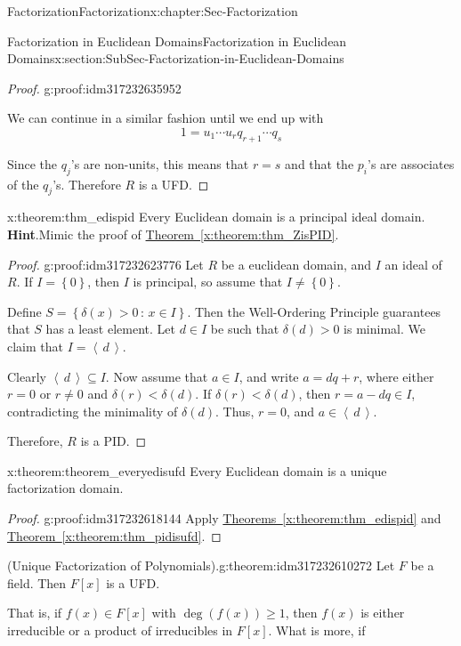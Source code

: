 \documentclass[oneside,10pt,]{book}
\newcommand{\blocktitlefont}{\relax}
\newcommand{\xreffont}{\relax}
\numberwithin{equation}{section}
\renewcommand{\ge}{\geqslant}
\newcommand{\ideal}[1]{\left\langle\, #1 \,\right\rangle}
\newcommand{\set}[1]{\left\{ {#1} \right\}}
\newcommand{\setof}[2]{{\left\{#1\,\colon\,#2\right\}}}
\newcommand{\lt}{<}
\begin{document}
\begin{chapterptx}{Factorization}{}{Factorization}{}{}{x:chapter:Sec-Factorization}
\begin{sectionptx}{Factorization in Euclidean Domains}{}{Factorization in Euclidean Domains}{}{}{x:section:SubSec-Factorization-in-Euclidean-Domains}
\begin{proof}{}{g:proof:idm317232635952}
%
\par
We can continue in a similar fashion until we end up with%
\begin{equation*}
1=u_1\cdots u_rq_{r+1}\cdots q_s
\end{equation*}
%
\par
Since the \(q_j\)'s are non-units, this means that \(r=s\) and that the \(p_i\)'s are associates of the \(q_j\)'s. Therefore \(R\) is a UFD.%
\end{proof}
\begin{theorem}{}{}{x:theorem:thm_edispid}%
Every Euclidean domain is a principal ideal domain.%
\textbf{\blocktitlefont Hint}.\quad{}Mimic the proof of \hyperref[x:theorem:thm_ZisPID]{Theorem~{\xreffont\ref{x:theorem:thm_ZisPID}}}.%
\end{theorem}
\begin{proof}{}{g:proof:idm317232623776}
Let \(R\) be a euclidean domain, and \(I\) an ideal of \(R\). If \(I = \set{0}\), then \(I\) is principal, so assume that \(I\ne \set{0}\).%
\par
Define \(S = \setof{\delta(x)>0}{x\in I}\). Then the Well-Ordering Principle guarantees that \(S\) has a least element. Let \(d\in I\) be such that \(\delta(d) > 0\) is minimal. We claim that \(I = \ideal{d}\).%
\par
Clearly \(\ideal{d}\subseteq I\). Now assume that \(a\in I\), and write \(a = dq + r\), where either \(r = 0\) or \(r\ne 0\) and \(\delta(r) \lt \delta(d)\). If \(\delta(r) \lt \delta(d)\), then \(r = a - dq \in I\), contradicting the minimality of \(\delta(d)\). Thus, \(r = 0\), and \(a\in \ideal{d}\).%
\par
Therefore, \(R\) is a PID.%
\end{proof}
\begin{theorem}{}{}{x:theorem:theorem_everyedisufd}%
Every Euclidean domain is a unique factorization domain.%
\end{theorem}
\begin{proof}{}{g:proof:idm317232618144}
Apply \hyperref[x:theorem:thm_edispid]{Theorems~{\xreffont\ref{x:theorem:thm_edispid}}} and \hyperref[x:theorem:thm_pidisufd]{Theorem~{\xreffont\ref{x:theorem:thm_pidisufd}}}.%
\end{proof}
\begin{theorem}{(Unique Factorization of Polynomials).}{}{g:theorem:idm317232610272}%
Let \(F\) be a field. Then \(F[x]\) is a UFD.%
\par
That is, if \(f(x) \in F[x]\) with \(\deg(f(x)) \ge 1\), then \(f(x)\) is either irreducible or a product of irreducibles in \(F[x]\). What is more, if%

\end{theorem}
\end{sectionptx}
\end{chapterptx}
\end{document}
